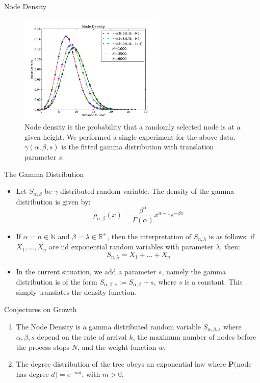 \documentclass[xcolor=dvipsnames]{beamer}
\newcommand{\bb}[1]{\textbf{#1}}
\begin{document}
\begin{frame}{Node Density}
\begin{figure}
\includegraphics[width = 2.75in]{NodeDensity.pdf}
\caption{Node density is the probability that a randomly selected node is at a given height.  We performed a single experiment for the above data. $\gamma(\alpha, \beta, s)$ is the fitted gamma distribution with translation parameter $s$.}
\end{figure}
\end{frame}

\begin{frame}{The Gamma Distribution}

\begin{itemize}\item Let $S_{\alpha, \beta}$ be $\gamma$ distributed random variable.  The density of the gamma distribution is given by:
$$
\rho_{\alpha, \beta}(x) = \frac{\beta^\alpha}{\Gamma(\alpha)}x^{\alpha-1}e^{ -\beta x}
$$
\item If $\alpha = n \in \mathbb{N}$ and $\beta = \lambda \in \mathbb R^+$, then the interpretation of $S_{n, \lambda}$ is as follows: if $X_1, \hdots, X_n$ are iid exponential random variables with parameter $\lambda$, then:
$$
S_{n, \lambda}= X_{1}+ \hdots + X_{n}
$$
\item In the current situation, we add a parameter $s$, namely the gamma distribution is of the form $S_{\alpha, \beta, s}:= S_{\alpha, \beta}+ s$, where $s$ is a constant.  This simply translates the density function.

\end{itemize}

\end{frame}



\begin{frame}{Conjectures on Growth}
\begin{enumerate}
\item The Node Density is a gamma distributed random variable $S_{\alpha, \beta, s}$ where $\alpha, \beta, s$ depend on the rate of arrival $k$, the maximum number of nodes before the process stops $N$, and the weight function $w$.
\item The degree distribution of the tree obeys an exponential law where $\bb P($node has degree $d) = e^{-m d}$, with $m>0$.
\end{enumerate}
\end{frame}
\end{document}
